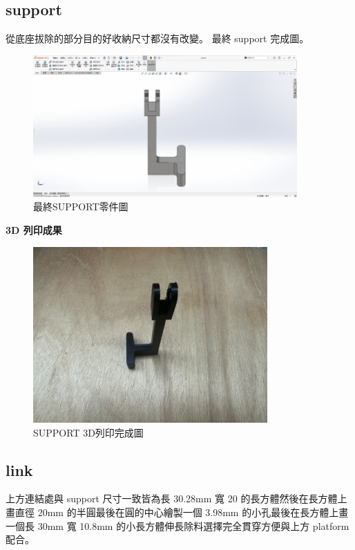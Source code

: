 \newpage

\subsection{support}

從底座拔除的部分目的好收納尺寸都沒有改變。
最終 support 完成圖。

\begin{figure}[htbp]
    \centering
    \includegraphics[width=0.90\textwidth]{./../images/6-1-40}
    \caption{最終SUPPORT零件圖}
\end{figure}

\textbf{3D 列印成果}

\begin{figure}[htbp]
    \centering
    \includegraphics[width=0.80\textwidth]{./../images/6-1-24}
    \caption{SUPPORT 3D列印完成圖}
\end{figure}

\subsection{link}

上方連結處與 support 尺寸一致皆為長 30.28mm 寬 20 的長方體然後在長方體上畫直徑 20mm 的半圓最後在圓的中心繪製一個 3.98mm 的小孔最後在長方體上畫一個長 30mm 寬 10.8mm 的小長方體伸長除料選擇完全貫穿方便與上方 platform 配合。

